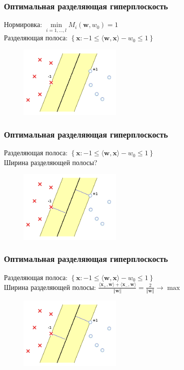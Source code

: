 \documentclass[12pt]{beamer}
\begin{document}
\begin{frame}\frametitle{Оптимальная разделяющая гиперплоскость}
Нормировка: $\min\limits_{i = 1, \dots , l} M_i(\mathbf{w}, w_0) = 1$\\
Разделяющая полоса: $\left\{\mathbf{x}: -1 \leq \langle \mathbf{w}, \mathbf{x}\rangle - w_0 \leq 1\right\}$
\begin{figure}[htbp]
  \includegraphics[height=100pt, keepaspectratio = true]{images/linearly_separable3}   
\end{figure}
\end{frame}

\begin{frame}\frametitle{Оптимальная разделяющая гиперплоскость}
Разделяющая полоса: $\left\{\mathbf{x}: -1 \leq \langle \mathbf{w}, \mathbf{x}\rangle - w_0 \leq 1\right\}$\\
Ширина разделяющей полосы?
\begin{figure}[htbp]
  \includegraphics[height=100pt, keepaspectratio = true]{images/linearly_separable2}   
\end{figure}
\end{frame}

\begin{frame}\frametitle{Оптимальная разделяющая гиперплоскость}
Разделяющая полоса: $\left\{\mathbf{x}: -1 \leq \langle \mathbf{w}, \mathbf{x}\rangle - w_0 \leq 1\right\}$\\
Ширина разделяющей полосы: $\frac{\langle \mathbf{x_{+}}, \mathbf{w} \rangle + \langle \mathbf{x_{-}}, \mathbf{w} \rangle}{\Vert \mathbf{w} \Vert} = \frac{2}{\Vert \mathbf{w} \Vert} \rightarrow \max$\\

\begin{figure}[htbp]
  \includegraphics[height=100pt, keepaspectratio = true]{images/linearly_separable2}   
\end{figure}
\end{frame}
\end{document}
